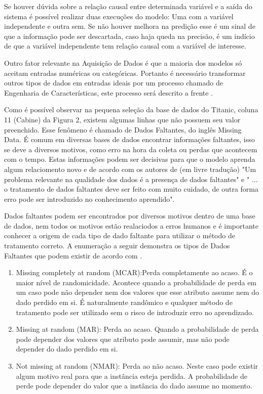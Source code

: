 Se houver dúvida sobre a relação causal entre determinada variável e a saída do sistema é possível realizar duas execuções do modelo: Uma com a variável independente e outra sem. Se não houver melhora na predição esse é um sinal de que a informação pode ser descartada, caso haja queda na precisão, é um indício de que a variável independente tem relação causal com a variável de interesse.

Outro fator relevante na Aquisição de Dados é que a maioria dos modelos só aceitam entradas numéricas ou categóricas. Portanto é necessário transformar outros tipos de dados em entradas ideais por um processo chamado de Engenharia de Características, este processo será descrito a frente \cite{real2013}. 

Como é possível observar na pequena seleção da base de dados do Titanic, coluna 11 (Cabine) da Figura 2, existem algumas linhas que não possuem seu valor preenchido. Esse fenômeno é chamado de Dados Faltantes, do inglês Missing Data. É comum em diversas bases de dados encontrar informações faltantes, isso se deve a diversos motivos, como erro na hora da coleta ou perdas que acontecem com o tempo. Estas informações podem ser decisivas para que o modelo aprenda algum relaciomento novo e de acordo com os autores de  (em livre tradução) "Um problema relevante na qualidade dos dados é a presença de dados faltantes" e " ... o tratamento de dados faltantes deve ser feito com muito cuidado, de outra forma erro pode ser introduzido no conhecimento aprendido". 

Dados faltantes podem ser encontrados por diversos motivos dentro de uma base de dados, nem todos os motivos estão realaciodos a erros humanos e é importante conhecer a origem de cada tipo de dado faltante para utilizar o método de tratamento correto. A enumeração a seguir demonstra os tipos de Dados Faltantes que podem existir de acordo com \cite{stat1987}.

\begin{enumerate}
\item Missing completely at random (MCAR):Perda completamente ao acaso. É o maior nível de randomicidade. Acontece quando a probabilidade de perda em um caso pode não depender nem dos valores que esse atributo assume nem do dado perdido em si. É naturalmente randômico e qualquer método de tratamento pode ser utilizado sem o risco de introduzir erro no aprendizado.
\item Missing at random (MAR): Perda ao acaso. Quando a probabilidade de perda pode depender dos valores que atributo pode assumir, mas não pode depender do dado perdido em si.
\item Not missing at random (NMAR): Perda ao não acaso. Neste caso pode existir algum motivo real para que a instância esteja perdida. A probabilidade de perde pode depender do valor que a instância do dado assume no momento.
\end{enumerate}

